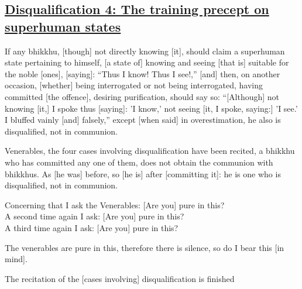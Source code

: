\subsection*{\hyperref[par4]{Disqualification 4: The training precept on superhuman states}}
\label{disq4}

If any bhikkhu, [though] not directly knowing [it], should claim a superhuman state pertaining to himself, [a state of] knowing and seeing [that is] suitable for the noble [ones], [saying]: ``Thus I know! Thus I see!,'' [and] then, on another occasion, [whether] being interrogated or not being interrogated, having committed [the offence], desiring purification, should say so: ``[Although] not knowing [it,] I spoke thus [saying]: 'I know,' not seeing [it, I spoke, saying:] 'I see.' I bluffed vainly [and] falsely,'' except [when said] in overestimation, he also is disqualified, not in communion.



\medskip

\begin{center}
	Venerables, the four cases involving disqualification have been recited, a bhikkhu who has committed any one of them, does not obtain the communion with bhikkhus. As [he was] before, so [he is] after [committing it]: he is one who is disqualified, not in communion.

	\smallskip

	Concerning that I ask the Venerables: [Are you] pure in this?\\
	A second time again I ask: [Are you] pure in this?\\
	A third time again I ask: [Are you] pure in this?

	\smallskip

	The venerables are pure in this, therefore there is silence, so do I bear this [in mind].
\end{center}

\begin{outro}
	The recitation of the [cases involving] disqualification is finished
\end{outro}

\clearpage


